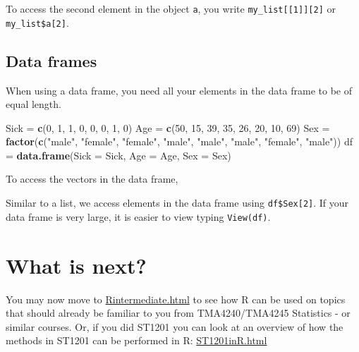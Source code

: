 \documentclass[]{article}
\newenvironment{Shaded}{\begin{snugshade}}{\end{snugshade}}
\newcommand{\KeywordTok}[1]{\textcolor[rgb]{0.13,0.29,0.53}{\textbf{#1}}}
\newcommand{\DataTypeTok}[1]{\textcolor[rgb]{0.13,0.29,0.53}{#1}}
\newcommand{\DecValTok}[1]{\textcolor[rgb]{0.00,0.00,0.81}{#1}}
\newcommand{\StringTok}[1]{\textcolor[rgb]{0.31,0.60,0.02}{#1}}
\newcommand{\OperatorTok}[1]{\textcolor[rgb]{0.81,0.36,0.00}{\textbf{#1}}}
\newcommand{\NormalTok}[1]{#1}
\begin{document}
To access the second element in the object \texttt{a}, you write
\texttt{my\_list{[}{[}1{]}{]}{[}2{]}} or \texttt{my\_list\$a{[}2{]}}.

\subsection{Data frames}\label{data-frames}

When using a data frame, you need all your elements in the data frame to
be of equal length.

\begin{Shaded}
\begin{Highlighting}[]
\NormalTok{Sick =}\StringTok{ }\KeywordTok{c}\NormalTok{(}\DecValTok{0}\NormalTok{, }\DecValTok{1}\NormalTok{, }\DecValTok{1}\NormalTok{, }\DecValTok{0}\NormalTok{, }\DecValTok{0}\NormalTok{, }\DecValTok{0}\NormalTok{, }\DecValTok{1}\NormalTok{, }\DecValTok{0}\NormalTok{)}
\NormalTok{Age =}\StringTok{ }\KeywordTok{c}\NormalTok{(}\DecValTok{50}\NormalTok{, }\DecValTok{15}\NormalTok{, }\DecValTok{39}\NormalTok{, }\DecValTok{35}\NormalTok{, }\DecValTok{26}\NormalTok{, }\DecValTok{20}\NormalTok{, }\DecValTok{10}\NormalTok{, }\DecValTok{69}\NormalTok{)}
\NormalTok{Sex =}\StringTok{ }\KeywordTok{factor}\NormalTok{(}\KeywordTok{c}\NormalTok{(}\StringTok{"male"}\NormalTok{, }\StringTok{"female"}\NormalTok{, }\StringTok{"female"}\NormalTok{, }\StringTok{"male"}\NormalTok{, }\StringTok{"male"}\NormalTok{, }\StringTok{"male"}\NormalTok{, }\StringTok{"female"}\NormalTok{, }
    \StringTok{"male"}\NormalTok{))}
\NormalTok{df =}\StringTok{ }\KeywordTok{data.frame}\NormalTok{(}\DataTypeTok{Sick =}\NormalTok{ Sick, }\DataTypeTok{Age =}\NormalTok{ Age, }\DataTypeTok{Sex =}\NormalTok{ Sex)}
\end{Highlighting}
\end{Shaded}

To access the vectors in the data frame,

\begin{Shaded}
\end{Shaded}

Similar to a list, we access elements in the data frame using
\texttt{df\$Sex{[}2{]}}. If your data frame is very large, it is easier
to view typing \texttt{View(df)}.

\section{What is next?}\label{what-is-next}

You may now move to
\href{https://www.math.ntnu.no/emner/TMA4268/2019v/1Intro/Rintermediate.html}{Rintermediate.html}
to see how R can be used on topics that should already be familiar to
you from TMA4240/TMA4245 Statistics - or similar courses. Or, if you did
ST1201 you can look at an overview of how the methods in ST1201 can be
performed in R:
\href{https://www.math.ntnu.no/emner/TMA4268/2019v/1Intro/ST1201inR.html}{ST1201inR.html}
\end{document}
